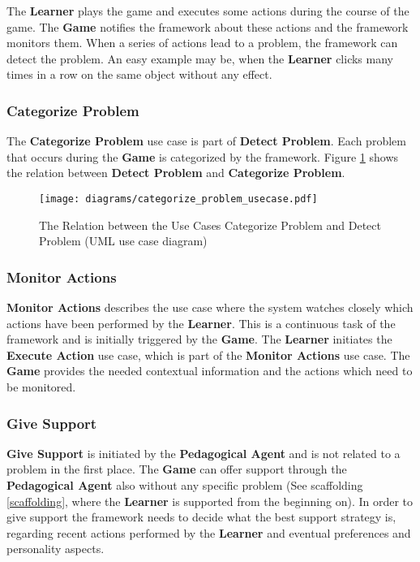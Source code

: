 The \textbf{Learner} plays the game and executes some actions during the
course of the game. The \textbf{Game} notifies the framework about these
actions and the framework monitors them. When a series of actions lead to a
problem, the framework can detect the problem. An easy example may be, when the
\textbf{Learner} clicks many times in a row on the
same object without any effect.


\subsubsection{Categorize Problem}
The \textbf{Categorize Problem} use case is part of \textbf{Detect
Problem}. Each problem that occurs during the \textbf{Game} is categorized by
the framework. Figure \ref{cat_problem} shows the relation between
\textbf{Detect Problem} and \textbf{Categorize Problem}.

\begin{figure}
    \centering
    \texttt{[image: diagrams/categorize\_problem\_usecase.pdf]}
    \caption[The Relation between the Use Cases Categorize Problem and Detect
    Problem (UML use case diagram)]
    {The Relation between the Use Cases Categorize Problem and Detect
    Problem (UML use case diagram)}
    \label{cat_problem}
\end{figure}

\subsubsection{Monitor Actions}
\textbf{Monitor Actions} describes the use case where the system watches
closely which actions have been performed by the \textbf{Learner}. This is a
continuous task of the framework and is initially triggered by the
\textbf{Game}. The \textbf{Learner} initiates the \textbf{Execute Action} use case,
which is part of the \textbf{Monitor Actions} use case. The \textbf{Game}
provides the needed contextual information and the actions which need to be monitored.

\subsubsection{Give Support}
\textbf{Give Support} is initiated by the \textbf{Pedagogical Agent} and is
not related to a problem in the first place. The \textbf{Game} can offer
support through the \textbf{Pedagogical Agent} also without any specific
problem (See scaffolding \ref{scaffolding}, where the \textbf{Learner} is
supported from the beginning on). In order to give support the framework needs
to decide what the best support strategy is, regarding recent actions
performed by the \textbf{Learner} and eventual preferences and personality
aspects.

